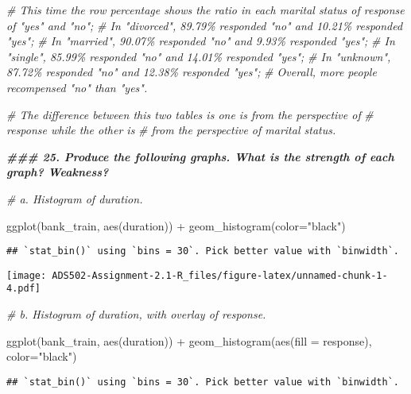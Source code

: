 \documentclass[
]{article}
\newenvironment{Shaded}{\begin{snugshade}}{\end{snugshade}}
\newcommand{\AttributeTok}[1]{\textcolor[rgb]{0.77,0.63,0.00}{#1}}
\newcommand{\CommentTok}[1]{\textcolor[rgb]{0.56,0.35,0.01}{\textit{#1}}}
\newcommand{\DocumentationTok}[1]{\textcolor[rgb]{0.56,0.35,0.01}{\textbf{\textit{#1}}}}
\newcommand{\FunctionTok}[1]{\textcolor[rgb]{0.00,0.00,0.00}{#1}}
\newcommand{\NormalTok}[1]{#1}
\newcommand{\SpecialCharTok}[1]{\textcolor[rgb]{0.00,0.00,0.00}{#1}}
\newcommand{\StringTok}[1]{\textcolor[rgb]{0.31,0.60,0.02}{#1}}
\begin{document}
\begin{Shaded}
\begin{Highlighting}[]
\CommentTok{\# This time the row percentage shows the ratio in each marital status of response of "yes" and "no";}
\CommentTok{\# In "divorced", 89.79\% responded "no" and 10.21\% responded "yes";}
\CommentTok{\# In "married", 90.07\% responded "no" and 9.93\% responded "yes";}
\CommentTok{\# In "single", 85.99\% responded "no" and 14.01\% responded "yes";}
\CommentTok{\# In "unknown", 87.72\% responded "no" and 12.38\% responded "yes";}
\CommentTok{\# Overall, more people recompensed "no" than "yes".}

\CommentTok{\# The difference between this two tables is one is from the perspective of }
\CommentTok{\# response while the other is }
\CommentTok{\# from the perspective of marital status.}


\DocumentationTok{\#\#\# 25. Produce the following graphs. What is the strength of each graph? Weakness?}

\CommentTok{\# a. Histogram of duration.}

\FunctionTok{ggplot}\NormalTok{(bank\_train, }\FunctionTok{aes}\NormalTok{(duration)) }\SpecialCharTok{+} \FunctionTok{geom\_histogram}\NormalTok{(}\AttributeTok{color=}\StringTok{"black"}\NormalTok{)}
\end{Highlighting}
\end{Shaded}

\begin{verbatim}
## `stat_bin()` using `bins = 30`. Pick better value with `binwidth`.
\end{verbatim}

\texttt{[image: ADS502-Assignment-2.1-R\_files/figure-latex/unnamed-chunk-1-4.pdf]}

\begin{Shaded}
\begin{Highlighting}[]
\CommentTok{\# b. Histogram of duration, with overlay of response.}

\FunctionTok{ggplot}\NormalTok{(bank\_train, }\FunctionTok{aes}\NormalTok{(duration)) }\SpecialCharTok{+} \FunctionTok{geom\_histogram}\NormalTok{(}\FunctionTok{aes}\NormalTok{(}\AttributeTok{fill =}\NormalTok{ response), }\AttributeTok{color=}\StringTok{"black"}\NormalTok{)}
\end{Highlighting}
\end{Shaded}

\begin{verbatim}
## `stat_bin()` using `bins = 30`. Pick better value with `binwidth`.
\end{verbatim}
\end{document}

